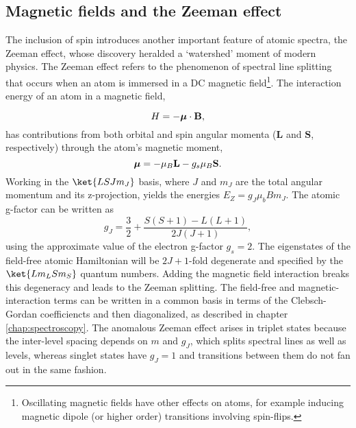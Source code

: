	

	
	

	\subsection*{Magnetic fields and the Zeeman effect}

	The inclusion of spin introduces another important feature of atomic spectra, the Zeeman effect, whose discovery heralded a `watershed' moment of modern physics.
	The Zeeman effect refers to the phenomenon of spectral line splitting that occurs when an atom is immersed in a DC magnetic field\footnote{Oscillating magnetic fields have other effects on atoms, for example inducing magnetic dipole (or higher order) transitions involving spin-flips.}.
	The interaction energy of an atom in a magnetic field, 
	
	\begin{equation}
		H = -\text{\boldmath$\mu$}\cdot \textbf{B},
	\end{equation}
	has contributions from both orbital and spin angular momenta ($\textbf{L}$ and $\textbf{S}$, respectively) through the atom's magnetic moment,
	\begin{equation}
		\text{\boldmath$\mu$} = -\mu_B\textbf{L} - g_s\mu_B \textbf{S}.
	\end{equation}
	Working in the $\ket{LSJm_J}$ basis, where $J$ and $m_J$ are the total angular momentum and its z-projection, yields the energies $E_Z = g_J \mu_b B m_J$.
	The atomic g-factor can be written as
	\begin{equation}
		g_J = \frac{3}{2} + \frac{S(S+1)-L(L+1)}{2J(J+1)},
	\end{equation}
	using the approximate value of the electron g-factor $g_s=2$.
	The eigenstates of the field-free atomic Hamiltonian will be $2J+1$-fold degenerate and specified by the $\ket{Lm_L S m_S}$ quantum numbers.
	Adding the magnetic field interaction breaks this degeneracy and leads to the Zeeman splitting.
	The field-free and magnetic-interaction terms can be written in a common basis in terms of the Clebsch-Gordan coefficiencts and then diagonalized, as described in chapter \ref{chap:spectroscopy}.
	The anomalous Zeeman effect arises in triplet states because the inter-level spacing depends on $m$ and $g_J$, which splits spectral lines as well as levels, whereas singlet states have $g_J=1$ and transitions between them do not fan out in the same fashion.
	

